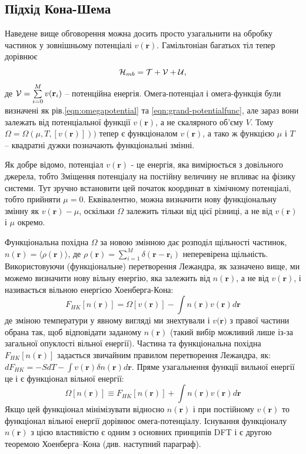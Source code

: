 \subsection{Підхід Кона-Шема}
Наведене вище обговорення можна досить просто узагальнити на обробку частинок у зовнішньому потенціалі $v(\textbf{r})$. Гамільтоніан багатьох тіл тепер дорівнює
\begin{equation}
\label{eqn:Ham}
	{\cal H}_{mb} = {\cal T} +{\cal V} +{\cal U},
\end{equation}
де ${\cal V} = \sum\limits_{i=0}^M v(\textbf{r}_i)$ -- потенційна енергія. Омега-потенціал і омега-функція були визначені як рів.\ref{eqn:omegapotential} та \ref{eqn:grand-potentialfunc}, але зараз вони залежать від потенціальної функції $v(\textbf{r})$, а не скалярного об'єму $V$. Тому $\Omega = \Omega(\mu, T, [v(\textbf{r})]))$ тепер є функціоналом $v(\textbf{r})$, а тако ж функцією $\mu$ і $T$ -- квадратні дужки позначають функціональні змінні. 

Як добре відомо, потенціал $v(\textbf{r})$ - це енергія, яка вимірюється з довільного джерела, тобто Зміщення потенціалу на постійну величину не впливає на фізику системи. Тут зручно встановити цей початок координат в хімічному потенціалі, тобто прийняти $\mu = 0$. Еквівалентно, можна визначити нову функціональну змінну як $v(\textbf{r}) - \mu$, оскільки $\Omega$ залежить тільки від цієї різниці, а не від $v(\textbf{r})$ і $\mu$ окремо.

Функціональна похідна $\Omega$ за новою змінною дає розподіл щільності частинок, $n(\textbf{r}) = \langle \rho (\textbf{r}) \rangle$, де $\rho(\textbf{r}) = \sum\limits_{i=1}^M\delta(\textbf{r}-\textbf{r}_i)$ неперевірена щільність. Використовуючи (функціональне) перетворення Лежандра, як зазначено вище, ми можемо визначити нову вільну енергію, яка залежить від $n(\textbf{r})$, а не від $v(\textbf{r})$, і називається вільною енергією Хоенберга-Кона:
\begin{equation}
	\label{eqn:free_energ_hoenberg-khon}
	F_{HK}[n(\textbf{r})] = \Omega[v(\textbf{r})] - \int{n(\textbf{r}) v(\textbf{r})d\textbf{r}} 
\end{equation}
де зміною температури у явному вигляді ми знехтували і $v(\textbf{r)}$ з правої частини обрана так, щоб відповідати заданому $n(\textbf{r})$ (такий вибір можливий лише із-за загальної опуклості вільної енергії). Частина та функціональна похідна $F_{HK}[n(\textbf{r})]$ задається звичайним правилом перетворення Лежандра, як: $dF_{HK} = -SdT - \int{v(\textbf{r})\delta n(\textbf{r})d\textbf{r}}$.
Пряме узагальнення функції вильної енергії це і є функціонал вільної енергії:
\begin{equation}
	\label{eqn:free_energ_functional}
	\Omega[n(\textbf{r})] \equiv F_{HK}[n(\textbf{r})] + \int{n(\textbf{r})v(\textbf{r})d\textbf{r}}
\end{equation}
Якщо цей функціонал мінімізувати відносно $n(\textbf{r})$ і при постійному $v(\textbf{r})$ то функціонал вільної енергії дорівнює омега-потенціалу. Існування функціоналу $n(\textbf{r})$ з цією властивістю є одним з основних принципів DFT і є другою теоремою Хоенберга–Кона (див. наступний параграф).

